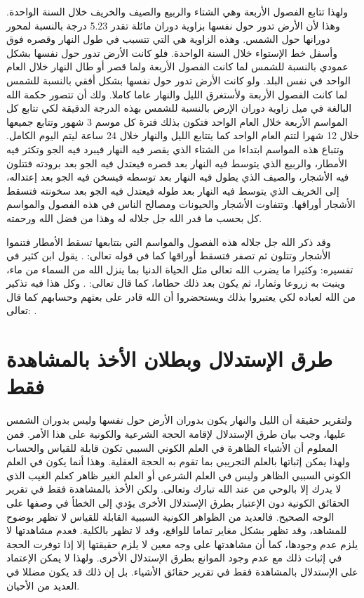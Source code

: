 ولهذا تتابع الفصول الأربعة وهي الشتاء والربيع والصيف والخريف خلال السنة الواحدة. وهذا لأن الأرض تدور حول نفسها بزاوية دوران مائلة تقدر 5.23 درجة بالنسبة لمحور دورانها حول الشمس. وهذه الزاوية هي التي تتسبب في طول النهار وقصره فوق وأسفل خط الإستواء خلال السنة الواحدة. فلو كانت الأرض تدور حول نفسها بشكل عمودي بالنسبة للشمس لما كانت الفصول الأربعة ولما قصر أو طال النهار خلال العام الواحد في نفس البلد. ولو كانت الأرض تدور حول نفسها بشكل أفقي بالنسبة للشمس لما كانت الفصول الأربعة ولأستغرق الليل والنهار عاما كاملا. ولك أن تتصور حكمة الله البالغة في ميل زاوية دوران الإرض بالنسبة للشمس بهذه الدرجة الدقيقة لكي تتابع كل المواسم الأربعة خلال العام الواحد فتكون بذلك فترة كل موسم 3 شهور وتتابع جميعها خلال 12 شهرا لتتم العام الواحد كما يتتابع الليل والنهار خلال 24 ساعة ليتم اليوم الكامل. وتتباع هذه المواسم ابتداءا من الشتاء الذي يقصر فيه النهار فيبرد فيه الجو وتكثر فيه الأمطار، والربيع الذي يتوسط فيه النهار بعد قصره فيعتدل فيه الجو بعد برودته فتتلون فيه الأشجار، والصيف الذي يطول فيه النهار بعد توسطه فيسخن فيه الجو بعد إعتداله، إلى الخريف الذي يتوسط فيه النهار بعد طوله فيعتدل فيه الجو بعد سخونته فتسقط الأشجار أوراقها. وتتفاوت الأشجار والحيونات ومصالح الناس في هذه الفصول والمواسم كل بحسب ما قدر الله جل جلاله له وهذا من فضل الله ورحمته.

وقد ذكر الله جل جلاله هذه الفصول والمواسم التي بتتابعها تسقط الأمطار فتنموا الأشجار وتتلون ثم تصفر فتسقط أوراقها كما في قوله تعالى: \quranayah*[39][21]{\footnotesize \surahname*[39]}. يقول ابن كثير في تفسيره: وكثيرا ما يضرب الله تعالى مثل الحياة الدنيا بما ينزل الله من السماء من ماء، وينبت به زروعا وثمارا، ثم يكون بعد ذلك حطاما، كما قال تعالى: \quranayah*[18][45]{\footnotesize \surahname*[18]} \href{https://shamela.ws/book/8473/3591#p4}{\faExternalLink} \cite{tafsir_ibnKathir}. وكل هذا فيه تذكير من الله لعباده لكي يعتبروا بذلك ويستحضروا أن الله قادر على بعثهم وحسابهم كما قال تعالى: \quranayah*[30][50]{\footnotesize \surahname*[9]}. 

\section{طرق الإستدلال وبطلان الأخذ بالمشاهدة فقط}

ولتقرير حقيقة أن الليل والنهار يكون بدوران الأرض حول نفسها وليس بدوران الشمس عليها، وجب بيان طرق الإستدلال لإقامة الحجة الشرعية والكونية على هذا الأمر. فمن المعلوم أن الأشياء الظاهرة في العلم الكوني السببي تكون قابلة للقياس والحساب ولهذا يمكن إثباتها بالعلم التجريبي بما تقوم به الحجة العقلية. وهذا أنما يكون في العلم الكوني السببي الظاهر وليس في العلم الشرعي أو العلم الغير ظاهر كعلم الغيب الذي لا يدرك إلا بالوحي من عند الله تبارك وتعالى. ولكن الأخذ بالمشاهدة فقط في تقرير الحقائق الكونية دون الإعتبار بطرق الإستدلال الأخرى يؤدي إلى الخطأ في وصفها على الوجه الصحيح. فالعديد من الظواهر الكونية السببية القابلة للقياس لا تظهر بوضوح للمشاهد، وقد تظهر بشكل مغاير تماما للواقع، وقد لا تظهر بالكلية. فعدم مشاهدتها لا يلزم عدم وجودها، كما أن مشاهدتها على وجه معين لا يلزم حقيقتها إلا إذا توفرت الحجة في إثبات ذلك مع عدم وجود الموانع بطرق الإستدلال الأخرى. ولهذا لا يمكن الإعتماد على الإستدلال بالمشاهدة فقط في تقرير حقائق الأشياء. بل إن ذلك قد يكون مضللا في العديد من الأحيان.

